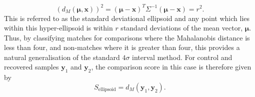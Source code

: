 \documentclass[a4paper]{article}
\newcommand{\bs}[1]{\boldsymbol{#1}}
\newcommand{\y}{\boldsymbol{y}}
\begin{document}
\begin{equation*}
    \label{eqn:stdev_ellipsoid}
    \left(d_M(\bs{\mu},\mathbf{x})\right)^2 =  (\bs{\mu}-\mathbf{x})^T \Sigma^{-1} (\bs{\mu}-\mathbf{x}) = r^2.
\end{equation*}
This is referred to as the standard deviational ellipsoid and any point which lies within this hyper-ellipsoid is within $r$ standard deviations of the mean vector, $\bs{\mu}$. Thus, by classifying matches for comparisons where the Mahalanobis distance is less than four, and non-matches where it is greater than four, this provides a natural generalisation of the standard $4\sigma$ interval method. For control and recovered samples $\y_1$ and $\y_2$, the comparison score in this case is therefore given by
\begin{equation*}
    S_{\text{ellipsoid}} = d_M(\bs{y}_1,\bs{y}_2).
\end{equation*}
\end{document}
